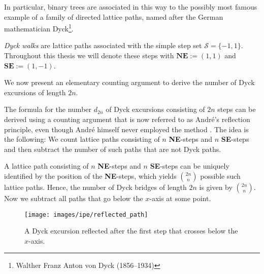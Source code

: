 In particular, binary trees are associated in this way to the possibly most famous example of a family of directed lattice paths, named after the German mathematician Dyck\footnote{Walther Franz Anton von Dyck (1856--1934)}.

\begin{definition}
  \textit{Dyck walks} are lattice paths associated with the simple step set $\mathcal{S} = \{-1,1\}$. Throughout this thesis we will denote these steps with $\textbf{NE} := (1,1)$ and $\textbf{SE} := (1,-1)$.
\end{definition}

We now present an elementary counting argument to derive the number of Dyck excursions of length $2n$.

\begin{example} \label{ex:ballot_problem}
  The formula for the number $d_{2n}$ of Dyck excursions consisting of $2n$ steps can be derived using a counting argument that is now referred to as André’s reflection principle, even though André himself never employed the method \cite{ReflectionPrinciple}.
  The idea is the following: We count lattice paths consisting of $n$ \textbf{NE}-steps and $n$ \textbf{SE}-steps and then subtract the number of such paths that are not Dyck paths.
  
  A lattice path consisting of $n$ \textbf{NE}-steps and $n$ \textbf{SE}-steps can be uniquely identified by the position of the \textbf{NE}-steps, which yields $\binom{2n}{n}$ possible such lattice paths.
  Hence, the number of Dyck bridges of length $2n$ is given by $\binom{2n}{n}$. Now we subtract all paths that go below the $x$-axis at some point.
  
  \begin{figure}
    \centering
    \texttt{[image: images/ipe/reflected\_path]}
    \caption[The reflection principle.]{A Dyck excursion reflected after the first step that crosses below the $x$-axis.}
    \label{fig:reflected_path}
  \end{figure}


\end{example}
